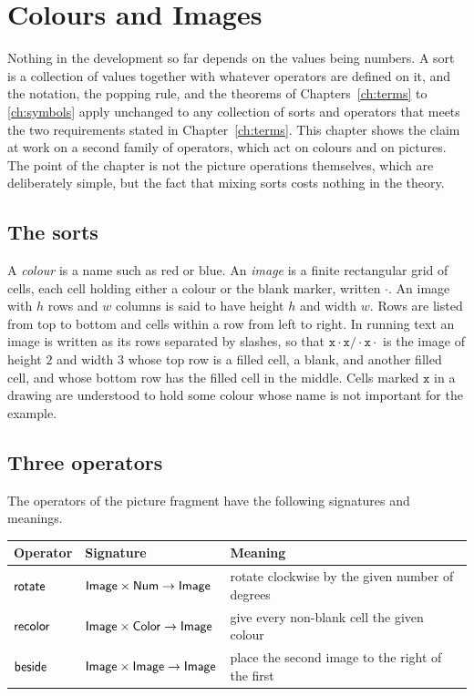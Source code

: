 \chapter{Colours and Images}
\label{ch:images}

Nothing in the development so far depends on the values being numbers. A sort is a collection of values together with whatever operators are defined on it, and the notation, the popping rule, and the theorems of Chapters~\ref{ch:terms} to \ref{ch:symbols} apply unchanged to any collection of sorts and operators that meets the two requirements stated in Chapter~\ref{ch:terms}. This chapter shows the claim at work on a second family of operators, which act on colours and on pictures. The point of the chapter is not the picture operations themselves, which are deliberately simple, but the fact that mixing sorts costs nothing in the theory.

\section{The sorts}

A \emph{colour} is a name such as $\mathrm{red}$ or $\mathrm{blue}$. An \emph{image} is a finite rectangular grid of cells, each cell holding either a colour or the blank marker, written $\cdot$. An image with $h$ rows and $w$ columns is said to have height $h$ and width $w$. Rows are listed from top to bottom and cells within a row from left to right. In running text an image is written as its rows separated by slashes, so that $\mathtt{x\cdot x/\cdot x\cdot}$ is the image of height $2$ and width $3$ whose top row is a filled cell, a blank, and another filled cell, and whose bottom row has the filled cell in the middle. Cells marked $\mathtt{x}$ in a drawing are understood to hold some colour whose name is not important for the example.

\section{Three operators}

The operators of the picture fragment have the following signatures and meanings.

\begin{center}
\begin{tabular}{@{}lll@{}}
\toprule
Operator & Signature & Meaning\\
\midrule
$\mathsf{rotate}$ & $\mathsf{Image}\times\mathsf{Num}\to\mathsf{Image}$ & rotate clockwise by the given number of degrees\\
$\mathsf{recolor}$ & $\mathsf{Image}\times\mathsf{Color}\to\mathsf{Image}$ & give every non-blank cell the given colour\\
$\mathsf{beside}$ & $\mathsf{Image}\times\mathsf{Image}\to\mathsf{Image}$ & place the second image to the right of the first\\
\bottomrule
\end{tabular}
\end{center}

